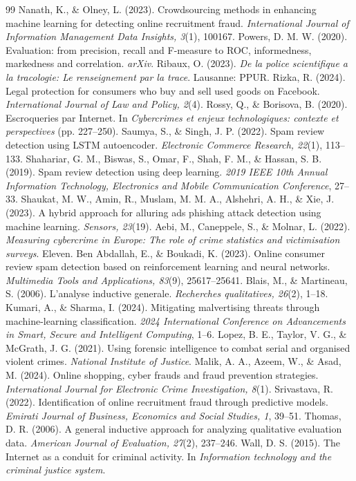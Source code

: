 \documentclass[11pt,a4paper]{article}
\begin{document}
\begin{thebibliography}{99}
 Nanath, K., \& Olney, L. (2023). Crowdsourcing methods in enhancing machine learning for detecting online recruitment fraud. \emph{International Journal of Information Management Data Insights, 3}(1), 100167.
 Powers, D. M. W. (2020). Evaluation: from precision, recall and F-measure to ROC, informedness, markedness and correlation. \emph{arXiv}.
 Ribaux, O. (2023). \emph{De la police scientifique a la tracologie: Le renseignement par la trace}. Lausanne: PPUR.
 Rizka, R. (2024). Legal protection for consumers who buy and sell used goods on Facebook. \emph{International Journal of Law and Policy, 2}(4).
 Rossy, Q., \& Borisova, B. (2020). Escroqueries par Internet. In \emph{Cybercrimes et enjeux technologiques: contexte et perspectives} (pp. 227--250).
 Saumya, S., \& Singh, J. P. (2022). Spam review detection using LSTM autoencoder. \emph{Electronic Commerce Research, 22}(1), 113--133.
 Shahariar, G. M., Biswas, S., Omar, F., Shah, F. M., \& Hassan, S. B. (2019). Spam review detection using deep learning. \emph{2019 IEEE 10th Annual Information Technology, Electronics and Mobile Communication Conference}, 27--33.
 Shaukat, M. W., Amin, R., Muslam, M. M. A., Alshehri, A. H., \& Xie, J. (2023). A hybrid approach for alluring ads phishing attack detection using machine learning. \emph{Sensors, 23}(19).
 Aebi, M., Caneppele, S., \& Molnar, L. (2022). \emph{Measuring cybercrime in Europe: The role of crime statistics and victimisation surveys}. Eleven.
 Ben Abdallah, E., \& Boukadi, K. (2023). Online consumer review spam detection based on reinforcement learning and neural networks. \emph{Multimedia Tools and Applications, 83}(9), 25617--25641.
 Blais, M., \& Martineau, S. (2006). L'analyse inductive generale. \emph{Recherches qualitatives, 26}(2), 1--18.
 Kumari, A., \& Sharma, I. (2024). Mitigating malvertising threats through machine-learning classification. \emph{2024 International Conference on Advancements in Smart, Secure and Intelligent Computing}, 1--6.
 Lopez, B. E., Taylor, V. G., \& McGrath, J. G. (2021). Using forensic intelligence to combat serial and organised violent crimes. \emph{National Institute of Justice}. 
 Malik, A. A., Azeem, W., \& Asad, M. (2024). Online shopping, cyber frauds and fraud prevention strategies. \emph{International Journal for Electronic Crime Investigation, 8}(1).
 Srivastava, R. (2022). Identification of online recruitment fraud through predictive models. \emph{Emirati Journal of Business, Economics and Social Studies, 1}, 39--51.
 Thomas, D. R. (2006). A general inductive approach for analyzing qualitative evaluation data. \emph{American Journal of Evaluation, 27}(2), 237--246.
 Wall, D. S. (2015). The Internet as a conduit for criminal activity. In \emph{Information technology and the criminal justice system}. 
\end{thebibliography}
\end{document}
